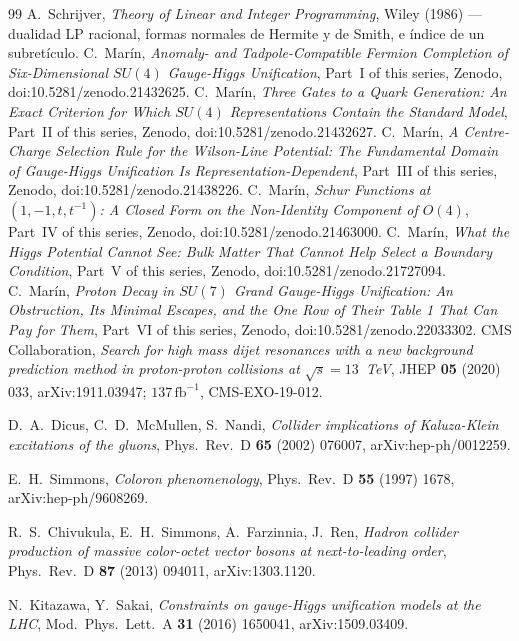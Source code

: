 \documentclass[11pt,a4paper]{article}
\newcommand{\su}[1]{SU(#1)}
\begin{document}
\begin{thebibliography}{99}
 A.~Schrijver, \emph{Theory of Linear and Integer Programming}, Wiley (1986) ---dualidad LP racional, formas normales de Hermite y de Smith, e índice de un subretículo.
 C.~Mar\'in, \emph{Anomaly- and Tadpole-Compatible Fermion Completion of Six-Dimensional $\su4$ Gauge-Higgs Unification}, Part~I of this series, Zenodo, doi:10.5281/zenodo.21432625.
 C.~Mar\'in, \emph{Three Gates to a Quark Generation: An Exact Criterion for Which $\su4$ Representations Contain the Standard Model}, Part~II of this series, Zenodo, doi:10.5281/zenodo.21432627.
 C.~Mar\'in, \emph{A Centre-Charge Selection Rule for the Wilson-Line Potential: The Fundamental Domain of Gauge-Higgs Unification Is Representation-Dependent}, Part~III of this series, Zenodo, doi:10.5281/zenodo.21438226.
 C.~Mar\'in, \emph{Schur Functions at $(1,-1,t,t^{-1})$: A Closed Form on the Non-Identity Component of $O(4)$}, Part~IV of this series, Zenodo, doi:10.5281/zenodo.21463000.
 C.~Mar\'in, \emph{What the Higgs Potential Cannot See: Bulk Matter That Cannot Help Select a Boundary Condition}, Part~V of this series, Zenodo, doi:10.5281/zenodo.21727094.
 C.~Mar\'in, \emph{Proton Decay in $\su7$ Grand Gauge-Higgs Unification: An Obstruction, Its Minimal Escapes, and the One Row of Their Table 1 That Can Pay for Them}, Part~VI of this series, Zenodo, doi:10.5281/zenodo.22033302.
 CMS Collaboration, \emph{Search for high mass dijet resonances with a new background prediction method in proton-proton collisions at $\sqrt{s}=13$~TeV}, JHEP \textbf{05} (2020) 033, arXiv:1911.03947; $137\,\mathrm{fb}^{-1}$, CMS-EXO-19-012.

 D.~A.~Dicus, C.~D.~McMullen, S.~Nandi, \emph{Collider implications of Kaluza-Klein excitations of the gluons}, Phys.\ Rev.\ D \textbf{65} (2002) 076007, arXiv:hep-ph/0012259.

 E.~H.~Simmons, \emph{Coloron phenomenology}, Phys.\ Rev.\ D \textbf{55} (1997) 1678, arXiv:hep-ph/9608269.

 R.~S.~Chivukula, E.~H.~Simmons, A.~Farzinnia, J.~Ren, \emph{Hadron collider production of massive color-octet vector bosons at next-to-leading order}, Phys.\ Rev.\ D \textbf{87} (2013) 094011, arXiv:1303.1120.

 N.~Kitazawa, Y.~Sakai, \emph{Constraints on gauge-Higgs unification models at the LHC}, Mod.\ Phys.\ Lett.\ A \textbf{31} (2016) 1650041, arXiv:1509.03409.


\end{thebibliography}
\end{document}

